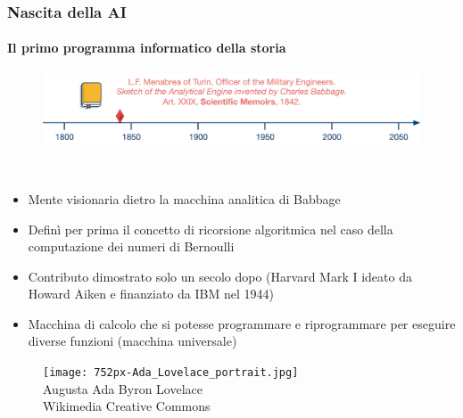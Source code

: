 \begin{frame}[t] \frametitle{Nascita della AI}
	{\scriptsize
		\onslide<1->
            \framesubtitle{Il primo programma informatico della storia}
            \vspace*{-.5cm}
             \begin{minipage}[t]{\textwidth}
             	\begin{figure}[ht]
                    \centering
                    \includegraphics[width=\textwidth]{img/AI-timeline-1842-alt.png}
                \end{figure}
            \end{minipage}
            \\\vspace*{.3cm}
	    	\begin{minipage}[t]{\textwidth}
				\begin{minipage}[t]{0.6\textwidth}
	    			\begin{itemize}[leftmargin=10pt,align=right]
						\onslide<2->\item[\alert{\faHandORight}] Mente visionaria dietro la \alert{macchina analitica di Babbage}
						\onslide<3->\item[\alert{\faHandORight}] Definì per prima il concetto di \alert{ricorsione algoritmica} nel caso della computazione dei numeri di Bernoulli
						\onslide<4->\item[\alert{\faHandORight}] Contributo dimostrato solo un secolo dopo (Harvard Mark I ideato da Howard Aiken e finanziato da IBM nel 1944)
						\onslide<5->\item[\alert{\faHandORight}] Macchina di calcolo che si potesse programmare e riprogrammare per eseguire diverse funzioni (\alert{macchina universale})
					\end{itemize}
            	\end{minipage}
            	\begin{minipage}[t]{0.4\textwidth}
                	\centering
                	\begin{figure}[ht]
                    	\texttt{[image: 752px-Ada\_Lovelace\_portrait.jpg]}
                    	{\tiny\\Augusta Ada Byron Lovelace\\\textcopyright Wikimedia Creative Commons}
                	\end{figure}
            	\end{minipage}
	    	\end{minipage}
	}
\end{frame}

